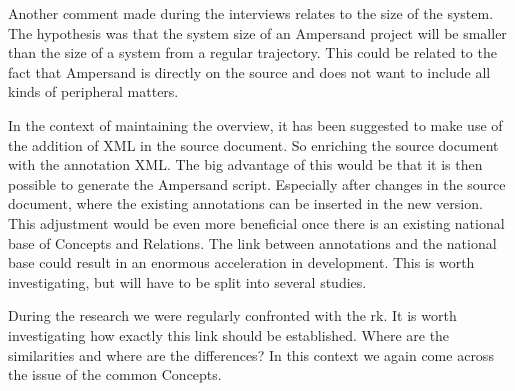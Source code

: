 Another comment made during the interviews relates to the size of the system.
The hypothesis was that the system size of an Ampersand project will be smaller than the size of a system from a regular trajectory.
This could be related to the fact that Ampersand is directly on the source and does not want to include all kinds of peripheral matters.

In the context of maintaining the overview, it has been suggested to make use of the addition of XML in the source document.
So enriching the source document with the annotation XML.
The big advantage of this would be that it is then possible to generate the Ampersand script.
Especially after changes in the source document, where the existing annotations can be inserted in the new version.
This adjustment would be even more beneficial once there is an existing national base of Concepts and Relations.
The link between annotations and the national base could result in an enormous acceleration in development.
This is worth investigating, but will have to be split into several studies.

During the research we were regularly confronted with the \acrshort{rk}.
It is worth investigating how exactly this link should be established.
Where are the similarities and where are the differences?
In this context we again come across the issue of the common Concepts.
